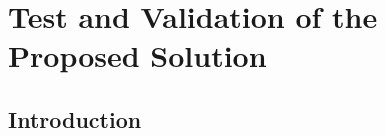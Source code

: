 \chapter{Test and Validation of the Proposed Solution}

\renewcommand{\chaptername}{Chapter}

\section*{Introduction}
%


